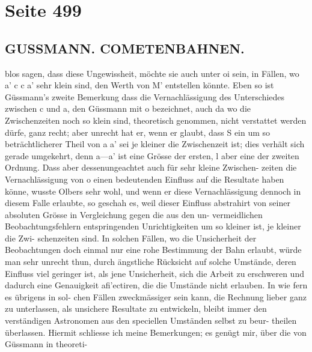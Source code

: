 \documentclass[10pt,a4paper]{article}
\begin{document}
\newpage
\section*{Seite 499}

\subsection*{GUSSMANN.     COMETENBAHNEN.}

blos  sagen,    dass  diese  Ungewissheit,    möchte  sie    auch  unter   o\glqq{}i   sein,   in  Fällen,    wo    a'\glqq{}   c\glqq{}   c\glqq{}   a'
sehr  klein  sind,  den  Werth  von  M'  entstellen  könnte.  Eben  so  ist  Güssmann's  zweite  Bemerkung  dass
die  Vernachlässigung  des  Unterschiedes  zwischen  c\glqq{}  und  a\glqq{},  den  Güssmann  mit  o  bezeichnet,  auch  da
wo  die  Zwischenzeiten  noch  so  klein  sind,    theoretisch  genommen,   nicht  verstattet  werden  dürfe,  ganz
recht;  aber  unrecht  hat  er,  wenn  er  glaubt,    dass   S   ein  um  so  beträchtlicherer  Theil  von    a\glqq{}   a'   sei
je  kleiner  die  Zwischenzeit  ist;  dies  verhält  sich  gerade  umgekehrt,  denn  a\glqq{}---a'  ist  eine  Grösse  der
ersten,  l  aber  eine  der  zweiten  Ordnung.  Dass  aber  dessenungeachtet  auch  für  sehr  kleine  Zwischen-
zeiten die  Vernachlässigung  von  o  einen  bedeutenden  Einfluss  auf  die  Resultate  haben  könne,  wusste
Olbers  sehr  wohl,  und  wenn  er  diese  Vernachlässigung  dennoch  in  diesem  Falle  erlaubte,  so  geschah
es,  weil  dieser  Einfluss  abstrahirt  von  seiner  absoluten  Grösse  in  Vergleichung  gegen  die  aus  den  un-
vermeidlichen Beobachtungsfehlern  entspringenden  Unrichtigkeiten  um  so  kleiner  ist,  je  kleiner  die  Zwi-
schenzeiten sind.  In  solchen  Fällen,  wo  die  Unsicherheit  der  Beobachtungen  doch  einmal  nur  eine  rohe
Bestimmung  der  Bahn  erlaubt,  würde  man  sehr  unrecht  thun,  durch  ängstliche  Rücksicht  auf  solche
Umstände,  deren  Einfluss  viel  geringer  ist,  als  jene  Unsicherheit,  sich  die  Arbeit  zu  erschweren  und
dadurch  eine  Genauigkeit  afi'ectiren,  die  die  Umstände  nicht  erlauben.  In  wie  fern  es  übrigens  in  sol-
chen Fällen  zweckmässiger  sein  kann,  die  Rechnung  lieber  ganz  zu  unterlassen,  als  unsichere  Resultate
zu  entwickeln,  bleibt  immer  den  verständigen  Astronomen  aus  den  speciellen  Umständen  selbst  zu  beur-
theilen  überlassen.
Hiermit  schliesse  ich  meine  Bemerkungen;  es  genügt  mir,  über  die  von  Güssmann  in  theoreti-
\end{document}
